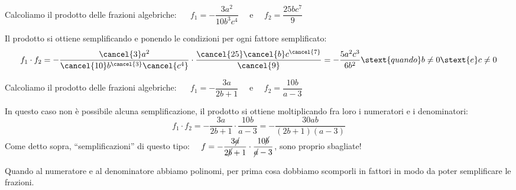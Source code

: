  \begin{esempio}
Calcoliamo il prodotto delle frazioni algebriche: ~~ 
\(f_{1}=-\dfrac{3a^{2}}{10b^{3}c^{4}}\) ~~e~~ 
\(f_{2}=\dfrac{25bc^{7}}{9}\)

Il prodotto si ottiene semplificando e ponendo le condizioni per ogni fattore 
semplificato: 
\[f_1 \cdot f_2 =
-\dfrac{\cancel{3}a^{2}}{\cancel{10}b^{\cancel{3}}\cancel{c^{4}}}
\cdot \dfrac{\cancel{25}\cancel{b}c^{\cancel{7}}}{\cancel{9}}=
-{\dfrac{5a^{2}c^{3}}{6b^{2}}} \stext{quando} b \neq 0 \stext{e} c \neq 0\]
 \end{esempio}

 \begin{esempio}
Calcoliamo il prodotto delle frazioni algebriche: ~~
\(f_{1}=-{\dfrac{3a}{2b+1}}\) ~~e~~ \(f_{2}=\dfrac{10b}{a-3}\)

In questo caso non è possibile alcuna semplificazione, il prodotto si ottiene 
moltiplicando fra loro i numeratori e i denominatori:
\[f_1 \cdot f_2 = 
-{\dfrac{3a}{2b+1}}\cdot\dfrac{10b}{a-3}=
-{\dfrac{30ab}{(2b+1)(a-3)}}\] 
\osservazione
Come detto sopra, ``semplificazioni'' di questo tipo:~~
\(f=-{\dfrac{3\cancel{a}}{2\cancel{b}+1}}\cdot
      \dfrac{10\cancel{b}}{\cancel{a}-3}\), 
sono proprio sbagliate!
 \end{esempio}

 Quando al numeratore e al denominatore abbiamo polinomi, per prima cosa 
dobbiamo scomporli in fattori in modo da poter semplificare le frazioni.
 

